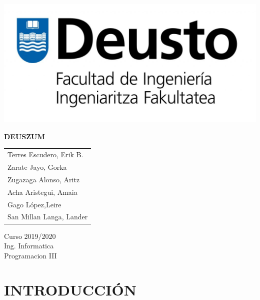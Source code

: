 \documentclass{article}
\theoremstyle{definition}
\begin{document}
\begin{titlepage}
	\begin{center}
	    \includegraphics[scale = 0.5]{LogoIngenieriaR.jpg}\\[1.0 cm]
	\end{center}
	
    \vspace*{150pt}
    \centering
    {\Huge
     \textbf{DEUSZUM}
    }
    
	\vspace*{200pt}
	
	
	\begin{minipage}{2in}
		\begin{tabular}{l}
			Terres Escudero, Erik B.    \\
			Zarate Jayo, Gorka   \\
			Zugazaga Alonso, Aritz  \\
			Acha Aristegui, Amaia  \\
			Gago López,Leire  \\
			San Millan Langa, Lander 
		\end{tabular}
	\end{minipage}
	\hfill
	\begin{minipage}{3in}
	\begin{flushright}
	\Large Curso 2019/2020 \\
		\Huge Ing. Informatica\\
		\LARGE Programacion III
	\end{flushright}
		
	\end{minipage}


    
	
\end{titlepage}

\tableofcontents

\clearpage

\section{INTRODUCCIÓN}
\end{document}
